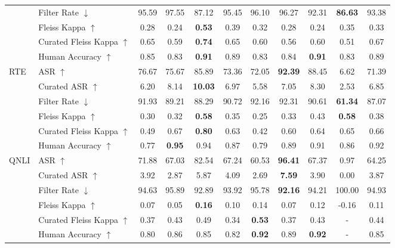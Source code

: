 \documentclass{article}
\begin{document}
\begin{table}[t]
{{\begin{tabular}{ll|cccccccc|c}
           & Filter Rate $\downarrow$ & 95.59 & 97.55 & 87.12 & 95.45 & 96.10 & 96.27 & 92.31 & \textbf{86.63} & 93.38 \\
           & Fleiss Kappa $\uparrow$  & 0.28 & 0.24 & \textbf{0.53} & 0.39 & 0.32 & 0.28 & 0.24 & 0.35 & 0.33 \\
           & Curated Fleiss Kappa $\uparrow$  & 0.65 & 0.59 & \textbf{0.74} & 0.65 & 0.60 & 0.56 & 0.60 & 0.51 & 0.67 \\
           & Human Accuracy $\uparrow$ & 0.85 & 0.83 & \textbf{0.91} & 0.89 & 0.83 & 0.84 & \textbf{0.91} & 0.83 & 0.89 \\
           \midrule
           \multirow{6}{*}{RTE} & ASR $\uparrow$ & 76.67 & 75.67 & 85.89 & 73.36 & 72.05 & \textbf{92.39} & 88.45 & 6.62 & 71.39 \\
           & Curated ASR $\uparrow$ & 6.20 & 8.14 & \textbf{10.03} & 6.97 & 5.58 & 7.05 & 8.30 & 2.53 & 6.85 \\
           & Filter Rate $\downarrow$ & 91.93 & 89.21 & 88.29 & 90.72 & 92.16 & 92.31 & 90.61 & \textbf{61.34} & 87.07 \\
           & Fleiss Kappa $\uparrow$  & 0.30 & 0.32 & \textbf{0.58} & 0.35 & 0.25 & 0.33 & 0.43 & \textbf{0.58} & 0.38 \\
           & Curated Fleiss Kappa $\uparrow$  & 0.49 & 0.67 & \textbf{0.80} & 0.63 & 0.42 & 0.60 & 0.64 & 0.65 & 0.66 \\
           & Human Accuracy $\uparrow$ & 0.77 & \textbf{0.95} & 0.94 & 0.87 & 0.79 & 0.89 & 0.91 & 0.86 & 0.92 \\
           \midrule
           \multirow{6}{*}{QNLI} & ASR $\uparrow$ & 71.88 & 67.03 & 82.54 & 67.24 & 60.53 & \textbf{96.41} & 67.37 & {0.97} & 64.25 \\
           & Curated ASR  $\uparrow$& 3.92 & 2.87 & 5.87 & 4.09 & 2.69 & \textbf{7.59} & 3.90 & 0.00 & 3.87 \\
           & Filter Rate $\downarrow$ & 94.63 & 95.89 & 92.89 & 93.92 & 95.78 & \textbf{92.16} & 94.21 & 100.00 & 94.93 \\
           & Fleiss Kappa $\uparrow$  & 0.07 & 0.05 & \textbf{0.16} & 0.10 & 0.14 & 0.07 & 0.12 & -0.16 & 0.11 \\
           & Curated Fleiss Kappa $\uparrow$  & 0.37 & 0.43 & 0.49 & 0.34 & \textbf{0.53} & 0.37 & 0.43 & - & 0.44 \\
           & Human Accuracy $\uparrow$ & 0.80 & 0.86 & 0.85 & 0.82 & \textbf{0.92} & 0.89 & \textbf{0.92} & - & 0.85 \\

\end{tabular}}}
\end{table}
\end{document}
